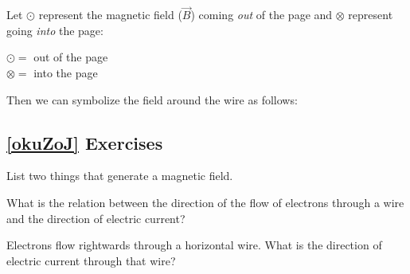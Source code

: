 \documentclass[main.tex]{subfiles}
\begin{document}
\vspace{1em}

Let $\odot$ represent the magnetic field ($\vec{B}$) coming \textit{out} of the page and $\otimes$ represent going \textit{into} the page:


\begin{center}
    $\odot = $ out of the page\\
    $\otimes = $ into the page
\end{center}

\clearpage

Then we can symbolize the field around the wire as follows:

\begin{center}
\captionsetup{type=figure,margin=1in}
\end{center}

\subsection*{\ref{okuZoJ} Exercises}

\begin{exercise}
    List two things that generate a magnetic field.
\end{exercise}

\begin{exercise}
    What is the relation between the direction of the flow of electrons through a wire and the direction of electric current?
\end{exercise}

\begin{exercise}
    Electrons flow rightwards through a horizontal wire. What is the direction of electric current through that wire?
\end{exercise}
\end{document}
